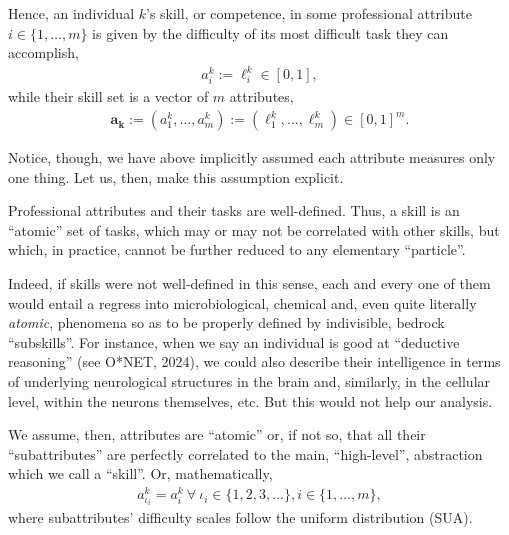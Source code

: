 \documentclass[hidelinks, nonatbib]{elsarticle}
\begin{document}
\begin{definition}[Skill]
    \label{def_skill}
    Hence, an individual $k$'s skill, or competence, in some professional attribute $i \in \{1, \dots, m\}$ is given by the difficulty of its most difficult task they can accomplish,
    \begin{gather}
        a_{i}^{k}
        :=
        \ell_{i}^{k}
        \in
        [0,1]
        ,
    \end{gather}
    while their skill set is a vector of $m$ attributes,
    \begin{gather}
        \boldsymbol{a_k}
        :=
        (
            a_{1}^{k}
            ,
            \dots
            ,
            a_{m}^{k}
        )
        :=
        (
            \ell_{1}^{k}
            ,
            \dots
            ,
            \ell_{m}^{k}
        )
        \in
        [0,1] ^ m
        .
    \end{gather}
\end{definition}

Notice, though, we have above implicitly assumed each attribute measures only one thing. Let us, then, make this assumption explicit.
\begin{axiom}
    \label{aaa}
    Professional attributes and their tasks are well-defined. Thus, a skill is an ``atomic'' set of tasks, which may or may not be correlated with other skills, but which, in practice, cannot be further reduced to any elementary ``particle''.
    
    Indeed, if skills were not well-defined in this sense, each and every one of them would entail a regress into microbiological, chemical and, even quite literally \textit{atomic}, phenomena so as to be properly defined by indivisible, bedrock ``subskills''. For instance, when we say an individual is good at ``deductive reasoning'' (see O*NET, 2024), we could also describe their intelligence in terms of underlying neurological structures in the brain and, similarly, in the cellular level, within the neurons themselves, etc. But this would not help our analysis.

    We assume, then, attributes are ``atomic'' or, if not so, that all their ``subattributes'' are perfectly correlated to the main, ``high-level'', abstraction which we call a ``skill''. Or, mathematically,
    \begin{gather}
        a_{\iota_i}^{k}
        =
        a_{i}^{k}
        \
        \forall
        \
        \iota_i
        \in 
        \{1, 2, 3, \dots\},
        i \in \{1, \dots, m\}
        ,
    \end{gather}
    where subattributes' difficulty scales follow the uniform distribution (SUA).
\end{axiom}
\end{document}
